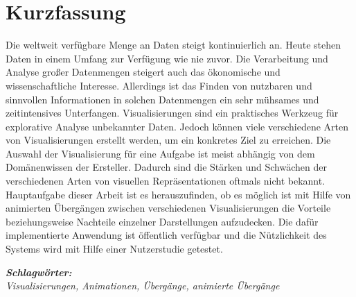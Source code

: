 
\section*{Kurzfassung}
\vspace{0.5cm}

Die weltweit verfügbare Menge an Daten steigt kontinuierlich an. Heute stehen Daten in einem Umfang zur Verfügung wie nie zuvor. Die Verarbeitung und Analyse großer Datenmengen steigert auch das ökonomische und wissenschaftliche Interesse. Allerdings ist das Finden von nutzbaren und sinnvollen Informationen in solchen Datenmengen ein sehr mühsames und zeitintensives Unterfangen. Visualisierungen sind ein praktisches Werkzeug für explorative Analyse unbekannter Daten. Jedoch können viele verschiedene Arten von Visualisierungen erstellt werden, um ein konkretes Ziel zu erreichen. Die Auswahl der Visualisierung für eine Aufgabe ist meist abhängig von dem Domänenwissen der Ersteller. Dadurch sind die Stärken und Schwächen der verschiedenen Arten von visuellen Repräsentationen oftmals nicht bekannt. Hauptaufgabe dieser Arbeit ist es herauszufinden, ob es möglich ist mit Hilfe von animierten Übergängen zwischen verschiedenen Visualisierungen die Vorteile beziehungsweise Nachteile einzelner Darstellungen aufzudecken. Die dafür implementierte Anwendung ist öffentlich verfügbar und die Nützlichkeit des Systems wird mit Hilfe einer Nutzerstudie getestet.

\vspace{0.5cm}
\textbf{\textit{Schlagwörter:}}\\
\textit{Visualisierungen, Animationen, Übergänge, animierte Übergänge}

